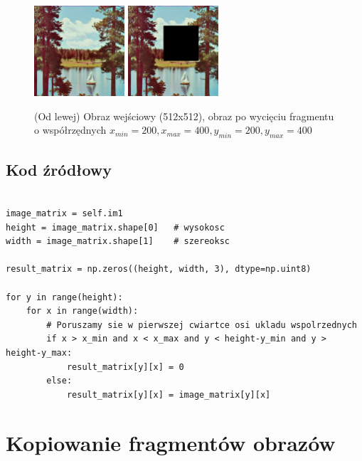 \documentclass[final,a4paper,openany,12pt]{mwbk}
\begin{document}
\begin{figure}[H]
	\begin{center}
		\includegraphics[width=0.3\textwidth]{2/2Geo_Cut_Original}
		\includegraphics[width=0.3\textwidth]{2/2Geo_Cut_Result}
	\end{center}
	\caption{(Od lewej) Obraz wejściowy (512x512), obraz po wycięciu fragmentu o współrzędnych $x_{min}=200, x_{max}=400, y_{min}=200, y_{max}=400$ }
\end{figure}


\subsection*{Kod źródłowy}


\begin{lstlisting}[caption= Wycinanie fragmentów obrazu]

image_matrix = self.im1
height = image_matrix.shape[0]   # wysokosc
width = image_matrix.shape[1]    # szereoksc

result_matrix = np.zeros((height, width, 3), dtype=np.uint8)

for y in range(height):
    for x in range(width): 
        # Poruszamy sie w pierwszej cwiartce osi ukladu wspolrzednych
        if x > x_min and x < x_max and y < height-y_min and y > height-y_max:
            result_matrix[y][x] = 0
        else:
            result_matrix[y][x] = image_matrix[y][x]

\end{lstlisting}
\newpage

\section{ Kopiowanie fragmentów obrazów}
\hfill\\
\indent
\end{document}
